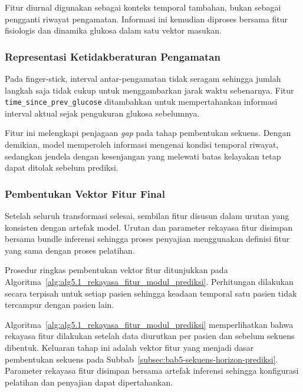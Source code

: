 Fitur diurnal digunakan sebagai konteks temporal tambahan, bukan sebagai pengganti riwayat pengamatan. Informasi ini kemudian diproses bersama fitur fisiologis
dan dinamika glukosa dalam satu vektor masukan.

\subsubsection{Representasi Ketidakberaturan Pengamatan}
\label{subsubsec:bab5-irregular-sampling}

Pada finger-stick, interval antar-pengamatan tidak seragam sehingga jumlah langkah saja tidak cukup untuk menggambarkan jarak waktu sebenarnya. Fitur
\texttt{time\_since\_prev\_glucose} ditambahkan untuk mempertahankan informasi interval aktual sejak pengukuran glukosa sebelumnya.

Fitur ini melengkapi penjagaan \textit{gap} pada tahap pembentukan sekuens. Dengan demikian, model memperoleh informasi mengenai kondisi temporal riwayat, sedangkan
jendela dengan kesenjangan yang melewati batas kelayakan tetap dapat ditolak sebelum prediksi.

\subsubsection{Pembentukan Vektor Fitur Final}
\label{subsubsec:bab5-vektor-fitur-final}

Setelah seluruh transformasi selesai, sembilan fitur disusun dalam urutan yang konsisten dengan artefak model. Urutan dan parameter rekayasa fitur disimpan bersama
bundle inferensi sehingga proses penyajian menggunakan definisi fitur yang sama dengan proses pelatihan.

Prosedur ringkas pembentukan vektor fitur ditunjukkan pada Algoritma~\ref{alg:alg5.1_rekayasa_fitur_modul_prediksi}. Perhitungan dilakukan secara terpisah untuk
setiap pasien sehingga keadaan temporal satu pasien tidak tercampur dengan pasien lain.



Algoritma~\ref{alg:alg5.1_rekayasa_fitur_modul_prediksi} memperlihatkan bahwa rekayasa fitur dilakukan setelah data diurutkan per pasien dan sebelum sekuens dibentuk.
Keluaran tahap ini adalah vektor fitur yang menjadi dasar pembentukan sekuens pada Subbab~\ref{subsec:bab5-sekuens-horizon-prediksi}. Parameter rekayasa fitur
disimpan bersama artefak inferensi sehingga konfigurasi pelatihan dan penyajian dapat dipertahankan.

